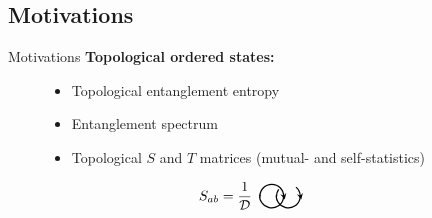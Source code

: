\documentclass[professionalfont]{beamer}
\newcommand{\wordfigdir}[2]{
\begin{minipage}[h]{#1 cm}
\centering
	\vspace{0pt}
	#2
\end{minipage}}
\begin{document}
\subsection{Motivations}
\begin{frame}{Motivations}
\textbf{Topological ordered states:}
\begin{figure}
    \centering
    \begin{minipage}{0.5\linewidth}
        \begin{itemize}
            \item Topological entanglement entropy
            \item Entanglement spectrum
            \item Topological $S$ and $T$ matrices (mutual- and self-statistics)
        \end{itemize}
    \end{minipage}
    \begin{minipage}{0.4\linewidth}
        \begin{equation*}
            \begin{aligned}
            &S_{ab} = \frac{1}{\mathcal{D}}
            \wordfigdir{1.4}{\begin{tikzpicture}[scale=0.6]
            
              \draw[line width=0.9pt, -<, >=stealth, shorten <=1pt]
                (0.9,0.7) ++(167:0.5) arc[start angle=167, end angle=373, radius=0.5];
            
              \draw[line width=0.9pt]
                (0.9,0.7) ++(0:0.5) arc[start angle=0, end angle=180, radius=0.5];
            
              \draw[line width=0.9pt, -<, >=stealth, shorten <=1pt]
                (1.6,0.7) ++(167:0.5) arc[start angle=167, end angle=373, radius=0.5];
            
              \draw[line width=0.9pt]
                (1.6,0.7) ++(0:0.5) arc[start angle=0, end angle=50, radius=0.5];
              \draw[line width=0.9pt]
                (1.6,0.7) ++(145:0.5) arc[start angle=145, end angle=180, radius=0.5];
            

\end{tikzpicture}}
\end{aligned}
\end{equation*}
\end{minipage}
\end{figure}
\end{frame}
\end{document}
